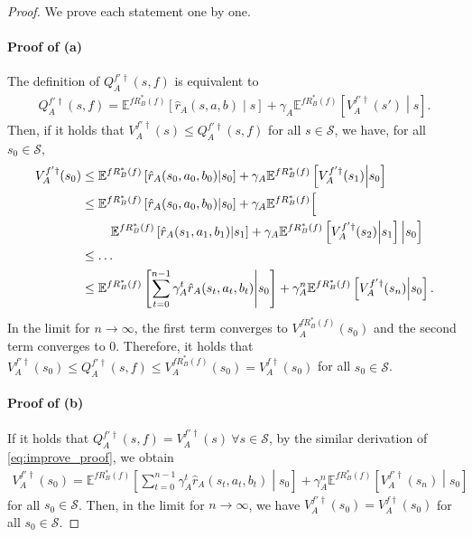 \documentclass{acml}
\providecommand{\E}{\mathbb{E}} %
\begin{document}
\begin{proof}
	We prove each statement one by one.
	\paragraph{Proof of (a)}
	The definition of $Q_A^{f'\dag}(s,f)$ is equivalent to
	\begin{align}
		Q_A^{f'\dag}(s,f)=\E^{fR_B^*(f)}\left[\hat{r}_A(s,a,b)\middle|s\right]+\gamma_A\E^{fR_B^*(f)}\left[V_A^{f'\dag}(s')\middle|s\right].
	\end{align}
	Then, if it holds that $V_A^{f'\dag}(s)\le Q_A^{f'\dag}(s,f)$ for all $s\in\mathcal{S}$, we have, for all $s_0\in\mathcal{S}$,
	\begin{subequations}\label{eq:improve_proof}
		\begin{align}
			V_A^{f'\dag}(s_0)&\le\E^{fR_B^*(f)}\left[\hat{r}_A(s_0,a_0,b_0)\middle|s_0\right]+\gamma_A\E^{fR_B^*(f)}\left[V_A^{f'\dag}(s_1)\middle|s_0\right]\\
			&\le\begin{multlined}[t]
				\E^{fR_B^*(f)}\left[\hat{r}_A(s_0,a_0,b_0)\middle|s_0\right]+\gamma_A\E^{fR_B^*(f)}\Bigl[\\
				\E^{fR_B^*(f)}\left[\hat{r}_A(s_1,a_1,b_1)\middle|s_1\right]+\gamma_A\E^{fR_B^*(f)}\left[V_A^{f'\dag}(s_2)\middle|s_1\right]\Bigl|s_0\Bigl]
			\end{multlined}\\
			&\le\dots\nonumber\\
			&\le\E^{fR_B^*(f)}\left[\sum_{t=0}^{n-1}\gamma_A^t\hat{r}_A(s_t,a_t,b_t)\middle|s_0\right] + \gamma_A^n\E^{fR_B^*(f)}\left[V_A^{f'\dag}(s_n)\middle|s_0\right].\label{eq:improve_infty}
		\end{align}
	\end{subequations}
	In the limit for $n\to\infty$, the first term converges to $V_A^{fR_B^*(f)}(s_0)$ and the second term converges to 0. 
	Therefore, it holds that $V_A^{f'\dag}(s_0)\le Q_A^{f'\dag}(s,f)\le V_A^{fR_B^*(f)}(s_0)=V_A^{f\dag}(s_0)$ for all $s_0\in\mathcal{S}$.
	
	\paragraph{Proof of (b)}
	If it holds that $Q_A^{f'\dag}(s,f)=V_A^{f'\dag}(s)~\forall s\in\mathcal{S}$, by the similar derivation of \cref{eq:improve_proof}, we obtain
	\begin{align}
		V_A^{f'\dag}(s_0)=\E^{fR_B^*(f)}\left[\sum_{t=0}^{n-1}\gamma_A^t\hat{r}_A(s_t,a_t,b_t)\middle|s_0\right] + \gamma_A^n\E^{fR_B^*(f)}\left[V_A^{f'\dag}(s_n)\middle|s_0\right]
	\end{align}
	for all $s_0\in\mathcal{S}$.
	Then, in the limit for $n\to\infty$, we have $V_A^{f'\dag}(s_0)=V_A^{f\dag}(s_0)$ for all $s_0\in\mathcal{S}$.
	

\end{proof}
\end{document}
